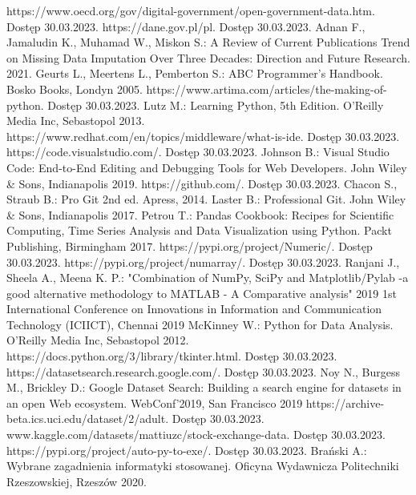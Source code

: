 \documentclass[12pt,twoside]{article}
\begin{document}
\begin{thebibliography}{4}
     https://www.oecd.org/gov/digital-government/open-government-data.htm. Dostęp 30.03.2023.
     https://dane.gov.pl/pl. Dostęp 30.03.2023.
     Adnan F., Jamaludin K., Muhamad W., Miskon S.: A Review of Current Publications Trend on Missing Data Imputation Over Three Decades: Direction and Future Research. 2021.
     Geurts L., Meertens L., Pemberton S.: ABC Programmer's Handbook. Bosko Books, Londyn 2005.
     https://www.artima.com/articles/the-making-of-python. Dostęp 30.03.2023.
     Lutz M.: Learning Python, 5th Edition. O'Reilly Media Inc, Sebastopol 2013.
     https://www.redhat.com/en/topics/middleware/what-is-ide. Dostęp 30.03.2023.
     https://code.visualstudio.com/. Dostęp 30.03.2023.
     Johnson B.: Visual Studio Code: End-to-End Editing and Debugging Tools for Web Developers. John Wiley \& Sons, Indianapolis 2019.
     https://github.com/. Dostęp 30.03.2023.
     Chacon S., Straub B.: Pro Git 2nd ed. Apress, 2014.
     Laster B.: Professional Git. John Wiley \& Sons, Indianapolis 2017.
     Petrou T.: Pandas Cookbook: Recipes for Scientific Computing, Time Series Analysis and Data Visualization using Python. Packt Publishing, Birmingham 2017.
     https://pypi.org/project/Numeric/. Dostęp 30.03.2023.
     https://pypi.org/project/numarray/. Dostęp 30.03.2023.
     Ranjani J., Sheela A., Meena K. P.: "Combination of NumPy, SciPy and Matplotlib/Pylab -a good alternative methodology to MATLAB - A Comparative analysis" 2019 1st International Conference on Innovations in Information and Communication Technology (ICIICT), Chennai 2019
     McKinney W.: Python for Data Analysis. O'Reilly Media Inc, Sebastopol 2012.
     https://docs.python.org/3/library/tkinter.html. Dostęp 30.03.2023.
     https://datasetsearch.research.google.com/. Dostęp 30.03.2023.
     Noy N., Burgess M., Brickley D.: Google Dataset Search: Building a search engine for datasets in an open Web ecosystem. WebConf'2019, San Francisco 2019
     https://archive-beta.ics.uci.edu/dataset/2/adult. Dostęp 30.03.2023.
     www.kaggle.com/datasets/mattiuzc/stock-exchange-data. Dostęp 30.03.2023.
     https://pypi.org/project/auto-py-to-exe/. Dostęp 30.03.2023.
     Brański A.: Wybrane zagadnienia informatyki stosowanej. Oficyna Wydawnicza Politechniki Rzeszowskiej, Rzeszów 2020.
\end{thebibliography}

\clearpage


\makesummary
\end{document}
